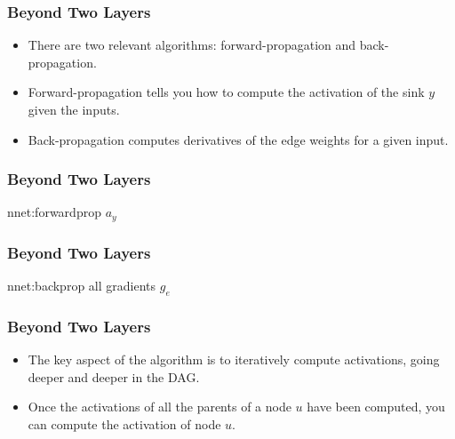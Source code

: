 \documentclass[trans]{beamer}
\begin{document}
\begin{frame}
  \frametitle{Beyond Two Layers}
\begin{itemize}
\item
There are two relevant algorithms: forward-propagation and
back-propagation.
\item  Forward-propagation tells you how to compute the
activation of the sink $y$ given the inputs.  
\item Back-propagation
computes derivatives of the edge weights for a given input.
\end{itemize}
\end{frame}

\begin{frame}
  \frametitle{Beyond Two Layers}
\newalgorithm%
  {nnet:forwardprop}%
  {}
  {
\ENDFOR
{}
\ENDFOR
\RETURN $a_y$
}
\end{frame}

\begin{frame}
  \frametitle{Beyond Two Layers}
\newalgorithm%
  {nnet:backprop}%
  {}
  {
\ENDFOR
\ENDFOR
\RETURN all gradients $g_e$
}
\end{frame}

\begin{frame}
  \frametitle{Beyond Two Layers}
\begin{itemize}
\item
The key aspect of the  algorithm is to
iteratively compute activations, going deeper and deeper in the DAG.
\item Once the activations of all the parents of a node $u$ have been
computed, you can compute the activation of node $u$.  
\end{itemize}
\end{frame}
\end{document}
